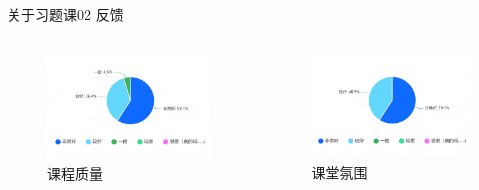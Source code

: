 \documentclass[]{beamer}
\begin{document}
\begin{frame}{关于习题课02 反馈}
    \begin{columns}
        \begin{column}{0.5\textwidth}
            \begin{figure}[H]
                \centering
                \includegraphics[width=1.0\linewidth]{quality.png}
                \caption{课程质量}
            \end{figure}
        \end{column}

        \begin{column}{0.5\textwidth}
            \begin{figure}[H]
                \centering
                \includegraphics[width=1.0\linewidth]{atmosphere.png}
                \caption{课堂氛围}
            \end{figure}
        \end{column}
    \end{columns}
\end{frame}
\end{document}
